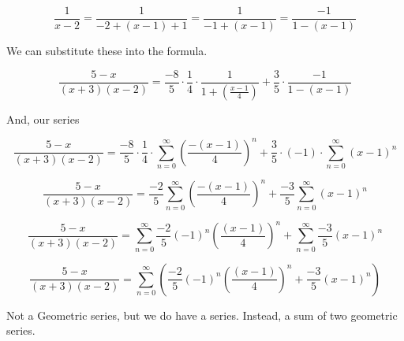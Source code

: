 \documentclass{ximera}
\begin{document}
\[    \frac{1}{x-2} =  \frac{1}{-2 + (x-1)+1}    =  \frac{1}{-1 + (x-1)}   =  \frac{-1}{1 - (x-1)}  \]



We can substitute these into the formula.






\[ \frac{5-x}{(x+3)(x-2)}     =  \frac{-8}{5} \cdot \frac{1}{4} \cdot \frac{1}{1+\left( \frac{x-1}{4} \right) } + \frac{3}{5} \cdot \frac{-1}{1 - (x-1)}      \]



And, our series



\[ \frac{5-x}{(x+3)(x-2)}     =  \frac{-8}{5} \cdot \frac{1}{4} \cdot     \sum_{n=0}^{\infty} \left( \frac{-(x-1)}{4} \right)^n                 + \frac{3}{5} \cdot (-1) \cdot \sum_{n=0}^{\infty} (x-1)^n     \]






\[ \frac{5-x}{(x+3)(x-2)}     =  \frac{-2}{5}     \sum_{n=0}^{\infty} \left( \frac{-(x-1)}{4} \right)^n                 + \frac{-3}{5} \sum_{n=0}^{\infty} (x-1)^n     \]












\[ \frac{5-x}{(x+3)(x-2)}     =      \sum_{n=0}^{\infty} \frac{-2}{5}  (-1)^n \left( \frac{(x-1)}{4} \right)^n                 +  \sum_{n=0}^{\infty} \frac{-3}{5} (x-1)^n     \]







\[ \frac{5-x}{(x+3)(x-2)}     =      \sum_{n=0}^{\infty} \left( \frac{-2}{5}  (-1)^n \left( \frac{(x-1)}{4} \right)^n                 +  \frac{-3}{5} (x-1)^n  \right)   \]










Not a Geometric series, but we do have a series. Instead, a sum of two geometric series.





\begin{center}
\end{center}
\end{document}
